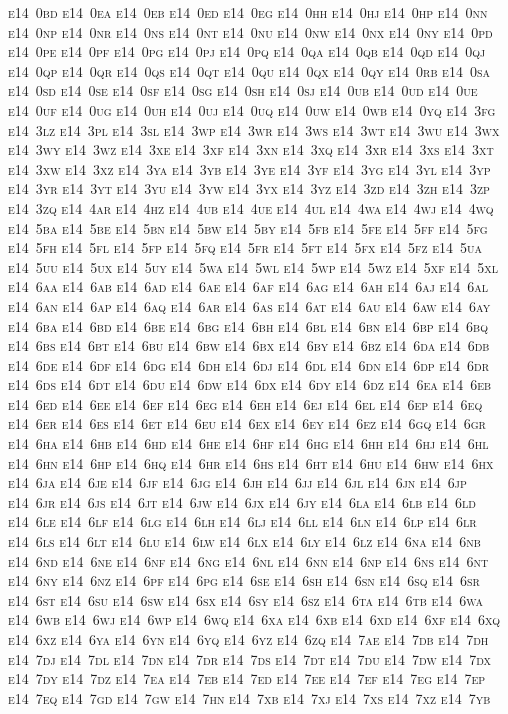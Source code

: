 \documentclass[12pt,a4paper]{article}
\begin{document}
\textsc{\lowercase{%
E14~0BD	E14~0EA	E14~0EB	E14~0ED	E14~0EG	E14~0HH
E14~0HJ	E14~0HP	E14~0NN	E14~0NP	E14~0NR	E14~0NS
E14~0NT	E14~0NU	E14~0NW	E14~0NX	E14~0NY	E14~0PD
E14~0PE	E14~0PF	E14~0PG	E14~0PJ	E14~0PQ	E14~0QA
E14~0QB	E14~0QD	E14~0QJ	E14~0QP	E14~0QR	E14~0QS
E14~0QT	E14~0QU	E14~0QX	E14~0QY	E14~0RB	E14~0SA
E14~0SD	E14~0SE	E14~0SF	E14~0SG	E14~0SH	E14~0SJ
E14~0UB	E14~0UD	E14~0UE	E14~0UF	E14~0UG	E14~0UH
E14~0UJ	E14~0UQ	E14~0UW	E14~0WB	E14~0YQ	E14~3FG
E14~3LZ	E14~3PL	E14~3SL	E14~3WP	E14~3WR	E14~3WS
E14~3WT	E14~3WU	E14~3WX	E14~3WY	E14~3WZ	E14~3XE
E14~3XF	E14~3XN	E14~3XQ	E14~3XR	E14~3XS	E14~3XT
E14~3XW	E14~3XZ	E14~3YA	E14~3YB	E14~3YE	E14~3YF
E14~3YG	E14~3YL	E14~3YP	E14~3YR	E14~3YT	E14~3YU
E14~3YW	E14~3YX	E14~3YZ	E14~3ZD	E14~3ZH	E14~3ZP
E14~3ZQ	E14~4AR	E14~4HZ	E14~4UB	E14~4UE	E14~4UL
E14~4WA	E14~4WJ	E14~4WQ	E14~5BA	E14~5BE	E14~5BN
E14~5BW	E14~5BY	E14~5FB	E14~5FE	E14~5FF	E14~5FG
E14~5FH	E14~5FL	E14~5FP	E14~5FQ	E14~5FR	E14~5FT
E14~5FX	E14~5FZ	E14~5UA	E14~5UU	E14~5UX	E14~5UY
E14~5WA	E14~5WL	E14~5WP	E14~5WZ	E14~5XF	E14~5XL
E14~6AA	E14~6AB	E14~6AD	E14~6AE	E14~6AF	E14~6AG
E14~6AH	E14~6AJ	E14~6AL	E14~6AN	E14~6AP	E14~6AQ
E14~6AR	E14~6AS	E14~6AT	E14~6AU	E14~6AW	E14~6AY
E14~6BA	E14~6BD	E14~6BE	E14~6BG	E14~6BH	E14~6BL
E14~6BN	E14~6BP	E14~6BQ	E14~6BS	E14~6BT	E14~6BU
E14~6BW	E14~6BX	E14~6BY	E14~6BZ	E14~6DA	E14~6DB
E14~6DE	E14~6DF	E14~6DG	E14~6DH	E14~6DJ	E14~6DL
E14~6DN	E14~6DP	E14~6DR	E14~6DS	E14~6DT	E14~6DU
E14~6DW	E14~6DX	E14~6DY	E14~6DZ	E14~6EA	E14~6EB
E14~6ED	E14~6EE	E14~6EF	E14~6EG	E14~6EH	E14~6EJ
E14~6EL	E14~6EP	E14~6EQ	E14~6ER	E14~6ES	E14~6ET
E14~6EU	E14~6EX	E14~6EY	E14~6EZ	E14~6GQ	E14~6GR
E14~6HA	E14~6HB	E14~6HD	E14~6HE	E14~6HF	E14~6HG
E14~6HH	E14~6HJ	E14~6HL	E14~6HN	E14~6HP	E14~6HQ
E14~6HR	E14~6HS	E14~6HT	E14~6HU	E14~6HW	E14~6HX
E14~6JA	E14~6JE	E14~6JF	E14~6JG	E14~6JH	E14~6JJ
E14~6JL	E14~6JN	E14~6JP	E14~6JR	E14~6JS	E14~6JT
E14~6JW	E14~6JX	E14~6JY	E14~6LA	E14~6LB	E14~6LD
E14~6LE	E14~6LF	E14~6LG	E14~6LH	E14~6LJ	E14~6LL
E14~6LN	E14~6LP	E14~6LR	E14~6LS	E14~6LT	E14~6LU
E14~6LW	E14~6LX	E14~6LY	E14~6LZ	E14~6NA	E14~6NB
E14~6ND	E14~6NE	E14~6NF	E14~6NG	E14~6NL	E14~6NN
E14~6NP	E14~6NS	E14~6NT	E14~6NY	E14~6NZ	E14~6PF
E14~6PG	E14~6SE	E14~6SH	E14~6SN	E14~6SQ	E14~6SR
E14~6ST	E14~6SU	E14~6SW	E14~6SX	E14~6SY	E14~6SZ
E14~6TA	E14~6TB	E14~6WA	E14~6WB	E14~6WJ	E14~6WP
E14~6WQ	E14~6XA	E14~6XB	E14~6XD	E14~6XF	E14~6XQ
E14~6XZ	E14~6YA	E14~6YN	E14~6YQ	E14~6YZ	E14~6ZQ
E14~7AE	E14~7DB	E14~7DH	E14~7DJ	E14~7DL	E14~7DN
E14~7DR	E14~7DS	E14~7DT	E14~7DU	E14~7DW	E14~7DX
E14~7DY	E14~7DZ	E14~7EA	E14~7EB	E14~7ED	E14~7EE
E14~7EF	E14~7EG	E14~7EP	E14~7EQ	E14~7GD	E14~7GW
E14~7HN	E14~7XB	E14~7XJ	E14~7XS	E14~7XZ	E14~7YB
}}
\end{document}
